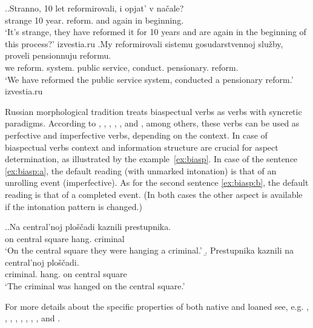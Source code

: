 \ex.\label{ex:biaspectual:borrowed}\ag.Stranno, 10 let reformirovali\textsuperscript{\IPF}, i opjat' v na\v{c}ale?\\
strange 10 year. reform. and again in beginning.\\
\trans `It's strange, they have reformed it for 10 years and are again in the beginning of this process?'
\hfill izvestia.ru
\bg.My reformirovali\textsuperscript{\PF} sistemu gosudarstvennoj slu\v{z}by, proveli pensionnuju reformu.\\
we reform. system. public service, conduct. pensionary. reform.\\
\trans `We have reformed the public service system, conducted a pensionary reform.'
\hfill izvestia.ru

Russian morphological tradition treats biaspectual verbs as verbs with syncretic paradigms. According to \citet{Galton:76}, \citet{Rosenthal:76}, \citet{Shvedova:82}, \citet{Certkova:96}, \citet{ZaliznjakShmelev:00}, and \citet{Janda:07a}, among others,  these verbs can be used as perfective and imperfective verbs, depending on the context. In case of biaspectual verbs context and information structure are crucial for aspect determination, as illustrated by the example~\ref{ex:biasp}. In case of the sentence \ref{ex:biasp:a}, the default reading (with unmarked intonation) is that of an unrolling event (imperfective). As for the second sentence \ref{ex:biasp:b}, the default reading is that of a completed event. (In both cases the other aspect is available if the intonation pattern is changed.)

\ex.\label{ex:biasp}\a.\label{ex:biasp:a}\gll Na central'noj plo\v{s}\v{c}adi kaznili\textsuperscript{\IPF} prestupnika.\\
on central square hang. criminal\\
\glt `On the central square they were hanging a criminal.'
\b.\label{ex:biasp:b} \gll Prestupnika kaznili\textsuperscript{\PF} na central'noj plo\v{s}\v{c}adi.\\
criminal. hang. on central square\\
\glt `The criminal was hanged on the central square.'

For more details about the specific properties of both native and loaned  see, e.g. \citet{Isachenko:60}, \citet{Avilova:68}, \citet{Skott:79}, \citet{Gladney:82}, \citet{Certkova:98}, \citet{Jaszay:99}, \citet{Anderson:02}, \citet{Timberlake:04}, and \citet{Janda:07a}. 

